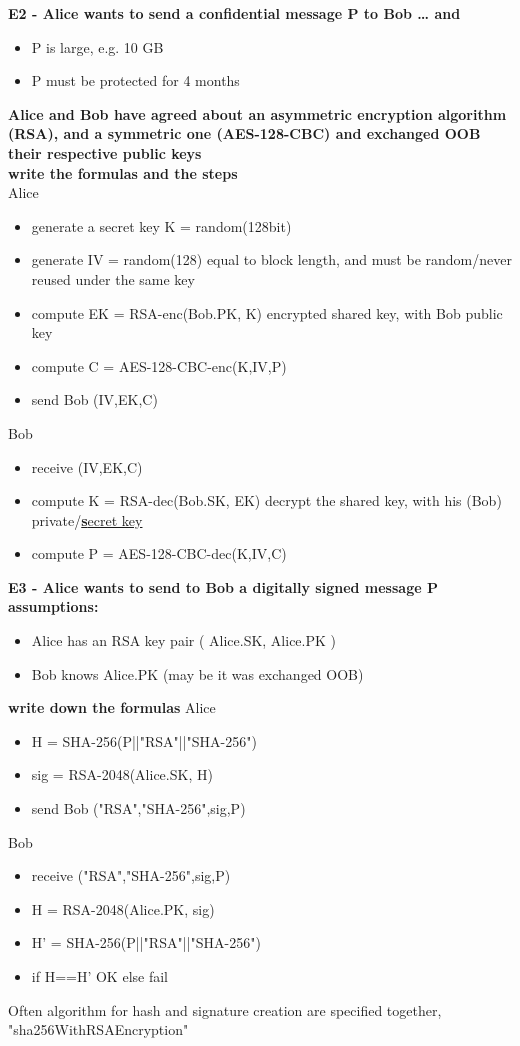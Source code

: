 \textbf{E2 - Alice wants to send a confidential message P to Bob … and}
\begin{itemize}
    \item P is large, e.g. 10 GB
    \item P must be protected for 4 months 
\end{itemize}
\textbf{Alice and Bob have agreed about an asymmetric encryption algorithm (RSA), and a symmetric one (AES-128-CBC) and exchanged OOB their respective public keys
\\ write the formulas and the steps\\}
Alice
\begin{itemize}
    \item generate a secret key K = random(128bit) 
    \item generate IV = random(128) \textcolor{Comment}{equal to block length, and must be random/never reused under the same key}
    \item compute EK = RSA-enc(Bob.PK, K) \textcolor{Comment}{encrypted shared key, with Bob public key} 
    \item compute C = AES-128-CBC-enc(K,IV,P)
    \item send Bob (IV,EK,C)
\end{itemize}
Bob
\begin{itemize}
    \item receive (IV,EK,C)
    \item compute K = RSA-dec(Bob.SK, EK) \textcolor{Comment}{decrypt the shared key, with his (Bob) private/\underline{\textbf{s}ecret key}}
    \item compute P = AES-128-CBC-dec(K,IV,C)
\end{itemize}


\textbf{E3 - Alice wants to send to Bob a digitally signed message P}
\textbf{assumptions:}
\begin{itemize}
    \item Alice has an RSA key pair ( Alice.SK, Alice.PK )
    \item Bob knows Alice.PK (may be it was exchanged OOB)
\end{itemize}
\textbf{write down the formulas}
Alice 
\begin{itemize}
    \item H =  SHA-256(P||"RSA"||"SHA-256")
    \item sig = RSA-2048(Alice.SK, H)
    \item send Bob ("RSA","SHA-256",sig,P)
\end{itemize}
Bob
\begin{itemize}
    \item receive ("RSA","SHA-256",sig,P)
    \item H = RSA-2048(Alice.PK, sig)
    \item H' = SHA-256(P||"RSA"||"SHA-256")
    \item if H==H' OK else fail
\end{itemize}
\textcolor{Comment}{Often algorithm for hash and signature creation are specified together, "sha256WithRSAEncryption"}

